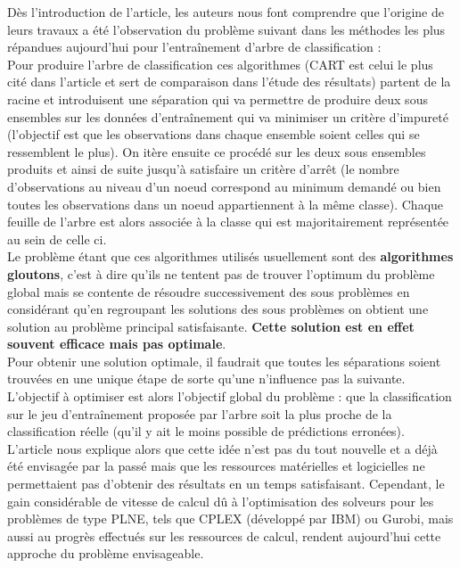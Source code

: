 \documentclass[12pt]{report}
\begin{document}
Dès l'introduction de l'article, les auteurs nous font comprendre que l'origine de leurs travaux a été l'observation du problème suivant dans les méthodes les plus répandues aujourd'hui pour l'entraînement d'arbre de classification : \\
Pour produire l'arbre de classification ces algorithmes (CART est celui le plus cité dans l'article et sert de comparaison dans l'étude des résultats) partent de la racine et introduisent une séparation qui va permettre de produire deux sous ensembles sur les données d'entraînement qui va minimiser un critère d'impureté (l'objectif est que les observations dans chaque ensemble soient celles qui se ressemblent le plus). On itère ensuite ce procédé sur les deux sous ensembles produits et ainsi de suite jusqu'à satisfaire un critère d'arrêt (le nombre d'observations au niveau d'un noeud correspond au minimum demandé ou bien toutes les observations dans un noeud appartiennent à la même classe). Chaque feuille de l'arbre est alors associée à la classe qui est majoritairement représentée au sein de celle ci.\\
Le problème étant que ces algorithmes utilisés usuellement sont des \textbf{algorithmes gloutons}, c'est à dire qu'ils ne tentent pas de trouver l'optimum du problème global mais se contente de résoudre successivement des sous problèmes en considérant qu'en regroupant les solutions des sous problèmes on obtient une solution au problème principal satisfaisante. \textbf{Cette solution est en effet souvent efficace mais pas optimale}.\\
Pour obtenir une solution optimale, il faudrait que toutes les séparations soient trouvées en une unique étape de sorte qu'une n'influence pas la suivante. L'objectif à optimiser est alors l'objectif global du problème : que la classification sur le jeu d'entraînement proposée par l'arbre soit la plus proche de la classification réelle (qu'il y ait le moins possible de prédictions erronées).\\
L'article nous explique alors que cette idée n'est pas du tout nouvelle et a déjà été envisagée par la passé mais que les ressources matérielles et logicielles ne permettaient pas d'obtenir des résultats en un temps satisfaisant. Cependant, le gain considérable de vitesse de calcul dû à l'optimisation des solveurs pour les problèmes de type PLNE, tels que CPLEX (développé par IBM) ou Gurobi, mais aussi au progrès effectués sur les ressources de calcul, rendent aujourd'hui cette approche du problème envisageable.\\
\vspace{0.5cm}
\end{document}
